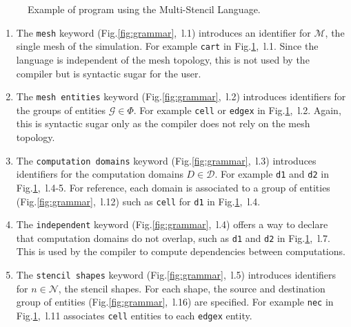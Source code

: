 \begin{figure}[!h]
  \hspace{5mm}
  \begin{minipage}[!h]{0.98\textwidth}
    {}   
    \caption{Example of program using the Multi-Stencil Language. \label{fig:exmsl}}
  \end{minipage}
\end{figure}

\begin{enumerate}

\item The \texttt{mesh} keyword (Fig.\ref{fig:grammar},~l.1) introduces an identifier for $\mathcal{M}$, the single mesh of the simulation. For example \texttt{cart} in Fig.\ref{fig:exmsl},~l.1. Since the language is independent of the mesh topology, this is not used by the compiler but is syntactic sugar for the user.%

\item The \texttt{mesh entities} keyword (Fig.\ref{fig:grammar},~l.2) introduces identifiers for the groups of entities $\mathcal{G}\in\Phi$. For example \texttt{cell} or \texttt{edgex} in Fig.\ref{fig:exmsl},~l.2. Again, this is syntactic sugar only as the compiler does not rely on the mesh topology.

\item The \texttt{computation domains} keyword (Fig.\ref{fig:grammar},~l.3) introduces identifiers for the computation domains $D\in\mathcal{D}$. For example \texttt{d1} and \texttt{d2} in Fig.\ref{fig:exmsl},~l.4-5. For reference, each domain is associated to a group of entities (Fig.\ref{fig:grammar},~l.12) such as \texttt{cell} for \texttt{d1} in Fig.\ref{fig:exmsl},~l.4.

\item The \texttt{independent} keyword (Fig.\ref{fig:grammar},~l.4) offers a way to declare that computation domains do not overlap, such as \texttt{d1} and \texttt{d2} in  Fig.\ref{fig:exmsl},~l.7. This is used by the compiler to compute dependencies between computations.

\item The \texttt{stencil shapes} keyword (Fig.\ref{fig:grammar},~l.5) introduces identifiers for $n\in\mathcal{N}$, the stencil shapes. For each shape, the source and destination group of entities (Fig.\ref{fig:grammar},~l.16) are specified. For example \texttt{nec} in Fig.\ref{fig:exmsl},~l.11 associates \texttt{cell} entities to each \texttt{edgex} entity.


\end{enumerate}
